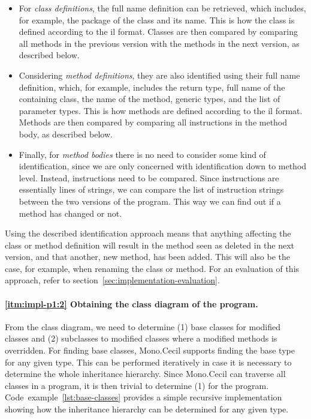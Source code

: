 \documentclass[a4paper,english,12pt]{report}
\begin{document}
\begin{itemize}
  \item For \textit{class definitions}, the full name definition can be retrieved, which includes, for example, the package of the class and its name. This is how the class is defined according to the \gls{il} format. Classes are then compared by comparing all methods in the previous version with the methods in the next version, as described below.
  \item Considering \textit{method definitions}, they are also identified using their full name definition, which, for example, includes the return type, full name of the containing class, the name of the method, generic types, and the list of parameter types. This is how methods are defined according to the \gls{il} format. Methods are then compared by comparing all instructions in the method body, as described below.
  \item Finally, for \textit{method bodies} there is no need to consider some kind of identification, since we are only concerned with identification down to method level. Instead, instructions need to be compared. Since instructions are essentially lines of strings, we can compare the list of instruction strings between the two versions of the program. This way we can find out if a method has changed or not.
\end{itemize}

Using the described identification approach means that anything affecting the class or method definition will result in the method seen as deleted in the next version, and that another, new method, has been added. This will also be the case, for example, when renaming the class or method. For an evaluation of this approach, refer to section~\vref{sec:implementation-evaluation}.

\paragraph{\ref{itm:impl-p1:2} Obtaining the class diagram of the program.} 
From the class diagram, we need to determine (1) base classes for modified classes and (2) subclasses to modified classes where a modified methods is overridden. For finding base classes, Mono.Cecil supports finding the base type for any given type. This can be performed iteratively in case it is necessary to determine the whole inheritance hierarchy. Since Mono.Cecil can traverse all classes in a program, it is then trivial to determine (1) for the  program. Code~example~\vref{lst:base-classes} provides a simple recursive implementation showing how the inheritance hierarchy can be determined for any given type.
\end{document}
